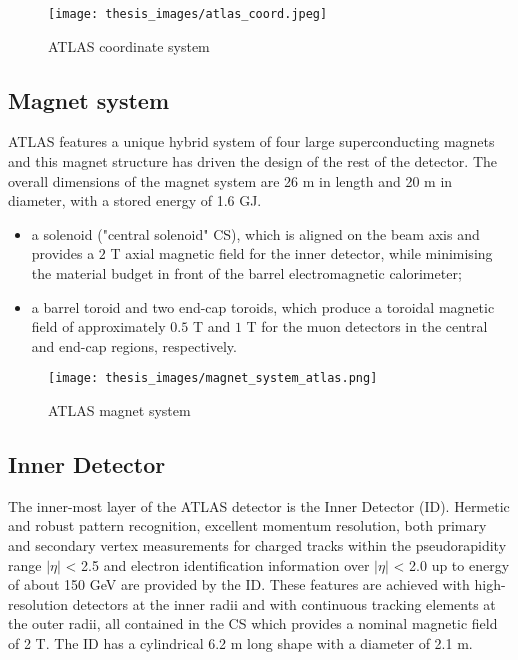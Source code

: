 \documentclass[a4paper, oneside, 11pt, openright]{book}
\begin{document}
				\begin{figure}[H]
					\centering
					\texttt{[image: thesis\_images/atlas\_coord.jpeg]}
					\caption{ATLAS coordinate system}
				\end{figure}
				
			\subsection{Magnet system}
				ATLAS features a unique hybrid system of four large superconducting magnets and this magnet structure has driven the design of the rest of the detector. The overall dimensions of the magnet system are 26 m in length and 20 m in diameter, with a stored energy of 1.6 GJ.
				\begin{itemize}
					\item a solenoid ("central solenoid" CS), which is aligned on the beam axis and provides a $2$ T axial magnetic field for the inner detector,  while minimising the material budget in front of the barrel electromagnetic calorimeter;
					\item a  barrel  toroid and  two  end-cap  toroids, which  produce  a toroidal magnetic field of approximately $0.5$ T and $1$ T for the muon detectors in the central and end-cap regions, respectively.
				\end{itemize}
			
				\begin{figure}
					\centering
					\texttt{[image: thesis\_images/magnet\_system\_atlas.png]}
					\caption{ATLAS magnet system}
				\end{figure}
			
			\subsection{Inner Detector}
				The inner-most layer of the ATLAS detector is the Inner Detector (ID). Hermetic and robust pattern recognition, excellent momentum resolution, both primary and secondary vertex measurements for charged tracks within the pseudorapidity range $|\eta|$ < 2.5 and electron identification information over $|\eta|$ < 2.0 up to energy of about 150 GeV are provided by the ID. These features are achieved with high-resolution detectors at the inner radii and  with continuous tracking elements at the outer radii, all contained in the CS which provides a nominal magnetic field of 2 T. The ID has a cylindrical 6.2 m long shape with a diameter of 2.1 m.
				
\end{document}
